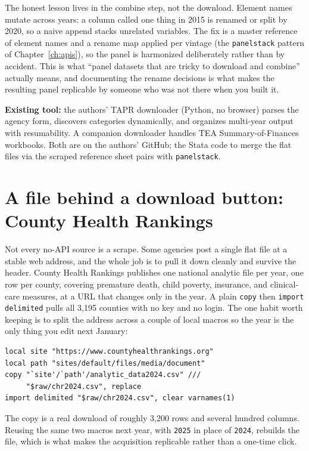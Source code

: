 \documentclass[
    a4paper,
    fontsize=10pt,
    twoside=true,
    numbers=noenddot,
]{kaobook}
\begin{document}
The honest lesson lives in the combine step, not the download. Element names mutate across years: a column called one thing in 2015 is renamed or split by 2020, so a naive append stacks unrelated variables. The fix is a master reference of element names and a rename map applied per vintage (the \texttt{panelstack} pattern of Chapter~\ref{ch:apis}), so the panel is harmonized deliberately rather than by accident. This is what \enquote{panel datasets that are tricky to download and combine} actually means, and documenting the rename decisions is what makes the resulting panel replicable by someone who was not there when you built it.

\begin{kaobox}[frametitle=Package Integration: \texttt{TEA-TAPR-download}]
\textbf{Existing tool:} the authors' TAPR downloader (Python, no browser) parses the agency form, discovers categories dynamically, and organizes multi-year output with resumability. A companion downloader handles TEA Summary-of-Finances workbooks. Both are on the authors' GitHub; the Stata code to merge the flat files via the scraped reference sheet pairs with \texttt{panelstack}.
\end{kaobox}

\section{A file behind a download button: County Health Rankings}\label{sec:chr}
Not every no-API source is a scrape. Some agencies post a single flat file at a stable web address, and the whole job is to pull it down cleanly and survive the header. County Health Rankings publishes one national analytic file per year, one row per county, covering premature death, child poverty, insurance, and clinical-care measures, at a URL that changes only in the year. A plain \texttt{copy} then \texttt{import delimited} pulls all 3{,}195 counties with no key and no login. The one habit worth keeping is to split the address across a couple of local macros so the year is the only thing you edit next January:
{\footnotesize
\begin{verbatim}
local site "https://www.countyhealthrankings.org"
local path "sites/default/files/media/document"
copy "`site'/`path'/analytic_data2024.csv" ///
     "$raw/chr2024.csv", replace
import delimited "$raw/chr2024.csv", clear varnames(1)
\end{verbatim}
}
The copy is a real download of roughly 3{,}200 rows and several hundred columns. Reusing the same two macros next year, with \texttt{2025} in place of \texttt{2024}, rebuilds the file, which is what makes the acquisition replicable rather than a one-time click.
\end{document}
